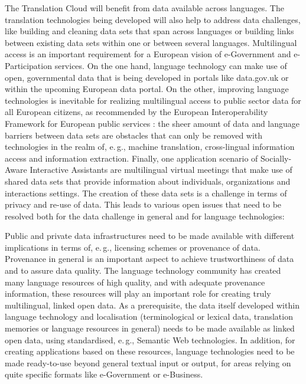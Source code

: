 \documentclass[10pt, plain]{../../metanetpaper}
\begin{document}
\begin{multicols}{2}
The Translation Cloud will benefit from data available across languages. The translation technologies being developed will also help to address data challenges, like building and cleaning data sets that span across languages or building links between existing data sets within one or between several languages. Multilingual access is an important requirement for a European vision of e-Government and e-Participation services. On the one hand, language technology can make use of open, governmental data that is being developed in portals like data.gov.uk or within the upcoming European data portal. On the other, improving language technologies is inevitable for realizing multilingual access to public sector data for all European citizens, as recommended by the European Interoperability Framework for European public services \cite{EIF2010}: the sheer amount of data and language barriers between data sets are obstacles that can only be removed with technologies in the realm of, e.\,g., machine translation, cross-lingual information access and information extraction. Finally, one application scenario of Socially-Aware Interactive Assistants are multilingual virtual meetings that make use of shared data sets that provide information about individuals, organizations and interactions settings. The creation of these data sets is a challenge in terms of privacy and re-use of data. This leads to various open issues that need to be resolved both for the data challenge in general and for language technologies:

Public and private data infrastructures need to be made available with different implications in terms of, e.\,g., licensing schemes or provenance of data. Provenance in general is an important aspect to achieve trustworthiness of data and to assure data quality. The language technology community has created many language resources of high quality, and with adequate provenance information, these resources will play an important role for creating truly multilingual, linked open data. As a prerequisite, the data itself developed within language technology and localisation (terminological or lexical data, translation memories or language resources in general) needs to be made available as linked open data, using standardised, e.\,g., Semantic Web technologies. In addition, for creating applications based on these resources, language technologies need to be made ready-to-use beyond general textual input or output, for areas relying on quite specific formats like e-Government or e-Business.


\end{multicols}
\end{document}
